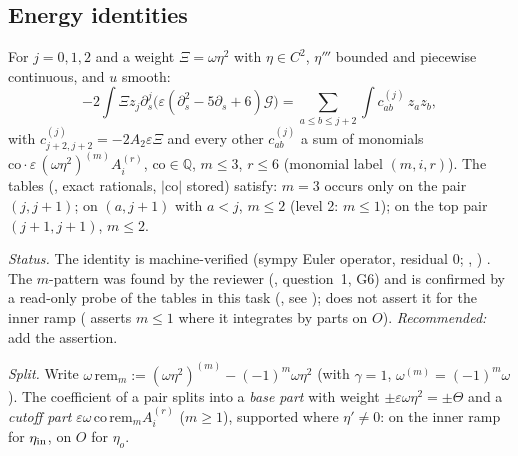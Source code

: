 \documentclass[11pt]{article}
\begin{document}
\subsection{Energy identities}
\begin{lemma}\label{A:lem:id}
For $j=0,1,2$ and a weight $\Xi=\omega\eta^2$ with $\eta\in C^2$, $\eta'''$ bounded and piecewise continuous, and $u$ smooth:
\[
-2\int\Xi z_j\partial_s^j\bigl(\varepsilon(\partial_s^2-5\partial_s+6)\mathcal G\bigr)=\sum_{a\le b\le j+2}\int c^{(j)}_{ab}\,z_az_b ,
\]
with $c^{(j)}_{j+2,j+2}=-2A_2\varepsilon\Xi$ and every other $c^{(j)}_{ab}$ a sum of monomials $\mathrm{co}\cdot\varepsilon\,(\omega\eta^2)^{(m)}A_i^{(r)}$, $\mathrm{co}\in\mathbb Q$, $m\le3$, $r\le6$ (monomial label $(m,i,r)$). The tables (, exact rationals, $|\mathrm{co}|$ stored) satisfy: $m=3$ occurs only on the pair $(j,j+1)$; on $(a,j+1)$ with $a<j$, $m\le2$ (level 2: $m\le1$); on the top pair $(j+1,j+1)$, $m\le2$.
\end{lemma}
\noindent\emph{Status.} The identity is machine-verified (sympy Euler operator, residual $0$; , ) \tC. The $m$-pattern was found by the reviewer (, question~1, G6) and is confirmed by a read-only probe of the tables in this task (, see );  does not assert it for the inner ramp ( asserts $m\le1$ where it integrates by parts on $O$). \emph{Recommended:} add the assertion.

\noindent\emph{Split.} Write $\omega\,\mathrm{rem}_m:=(\omega\eta^2)^{(m)}-(-1)^m\omega\eta^2$ (with $\gamma=1$, $\omega^{(m)}=(-1)^m\omega$). The coefficient of a pair splits into a \emph{base part} with weight $\pm\varepsilon\omega\eta^2=\pm\Theta$ and a \emph{cutoff part} $\varepsilon\omega\,\mathrm{co}\,\mathrm{rem}_m A_i^{(r)}$ ($m\ge1$), supported where $\eta'\ne0$: on the inner ramp for $\eta_{\rm in}$, on $O$ for $\eta_o$.
\end{document}

